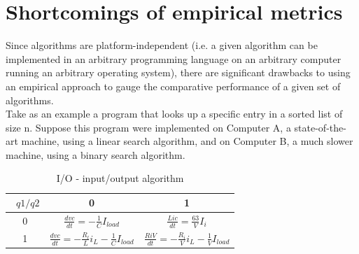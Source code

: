 \documentclass[openany,a4paper,12pt]{book}
\begin{document}
\section{Shortcomings of empirical metrics}

Since algorithms are platform-independent (i.e. a given algorithm can be implemented in an arbitrary programming language on an arbitrary computer running an arbitrary operating system), there are significant drawbacks to using an empirical approach to gauge the comparative performance of a given set of algorithms.
\newline\\
Take as an example a program that looks up a specific entry in a sorted list of size n. Suppose this program were implemented on Computer A, a state-of-the-art machine, using a linear search algorithm, and on Computer B, a much slower machine, using a binary search algorithm.

\begin{table}[H]
\caption{I/O - input/output algorithm} 
\begin{center} 
\begin{tabular}{|c|c|c|}
\hline \ $q1/q2$ & 0 & 1 \\ \hline
0 & $\frac{d{v} c}{d t} = -\frac{1}{C}I_{load}$ & $\frac{L{i} c}{d t} = \frac{63}{V}I_{i}$  \\
1 & $\frac{d{v} c}{d t} = -\frac{R_{l}}{L} i_{L}- \frac{1}{C}I_{load}$ & $\frac{R{i} V}{d t} = -\frac{R_{i}}{V} i_{L}- \frac{1}{V}I_{load}$ \\ \hline
\end{tabular}
\end{center}
\end{table}
\end{document}
